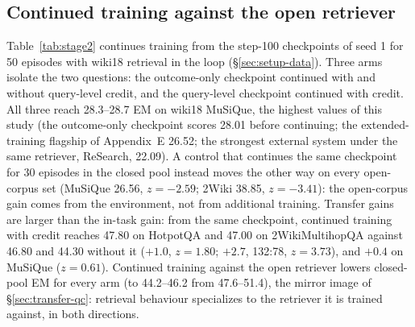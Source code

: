 \begin{table}[t]
\centering
\small
{}
\caption{Evidence reachability at top-10 dense retrieval under three
query regimes and three corpora. The decomposition oracle uses the
official sub-questions with gold intermediate answers; the title oracle
queries with the gold paragraphs' titles.}
\label{tab:reach}
\end{table}

\subsection{Continued training against the open retriever}
\label{sec:transfer-stage2}

Table~\ref{tab:stage2} continues training from the step-100
checkpoints of seed 1 for 50 episodes with wiki18 retrieval in the
loop (\S\ref{sec:setup-data}). Three arms isolate the two questions:
the outcome-only checkpoint continued with and without query-level
credit, and the query-level checkpoint continued with credit. All
three reach 28.3--28.7 EM on wiki18 MuSiQue, the highest values of
this study (the outcome-only checkpoint scores 28.01 before continuing;
the extended-training flagship of Appendix~E 26.52; the strongest
external system under the same retriever, ReSearch, 22.09). A control
that continues the same checkpoint for 30 episodes in the closed pool
instead moves the other way on every open-corpus set (MuSiQue 26.56,
$z=-2.59$; 2Wiki 38.85, $z=-3.41$): the open-corpus gain comes from the
environment, not from additional training. Transfer gains are larger
than the in-task gain: from the same checkpoint, continued training with
credit reaches 47.80 on HotpotQA and 47.00 on 2WikiMultihopQA against
46.80 and 44.30 without it ($+1.0$, $z=1.80$; $+2.7$, 132:78,
$z=3.73$), and $+0.4$ on MuSiQue ($z=0.61$). Continued training against
the open retriever lowers closed-pool EM for every arm (to 44.2--46.2
from 47.6--51.4), the mirror image of \S\ref{sec:transfer-qc}:
retrieval behaviour specializes to the retriever it is trained
against, in both directions.

